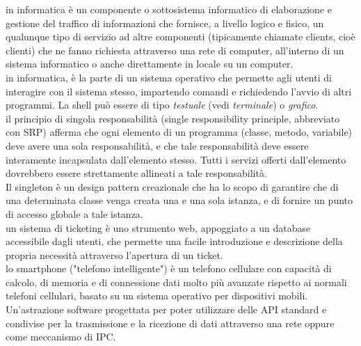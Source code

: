 \documentclass{scalatekids-article}
\begin{document}
   in informatica è un componente o sottosistema informatico di elaborazione e gestione del traffico di informazioni che fornisce, a livello logico e fisico, un qualunque tipo di servizio ad altre componenti (tipicamente chiamate clients, cioè clienti) che ne fanno richiesta attraverso una rete di computer, all'interno di un sistema informatico o anche direttamente in locale su un computer.
  \\
  
   in informatica, è la parte di un sistema operativo che permette agli utenti di interagire con il sistema stesso, impartendo comandi e richiedendo l'avvio di altri programmi.
  La shell può essere di tipo \textit{testuale} (vedi \textit{terminale}) o \textit{grafico}.
  \\

   il principio di singola responsabilità (single responsibility principle, abbreviato con SRP) afferma che ogni elemento di un programma (classe, metodo, variabile) deve avere una sola responsabilità, e che tale responsabilità deve essere interamente incapsulata dall'elemento stesso. Tutti i servizi offerti dall'elemento dovrebbero essere strettamente allineati a tale responsabilità.
  \\

   Il singleton è un design pattern creazionale che ha lo scopo di garantire che di una determinata classe venga creata una e una sola istanza, e di fornire un punto di accesso globale a tale istanza.
  \\

   un sistema di ticketing è uno strumento web, appoggiato a un database accessibile dagli utenti, che permette una facile introduzione e descrizione della propria necessità attraverso l’apertura di un ticket.
  \\

   lo smartphone ("telefono intelligente") è un telefono cellulare con capacità di calcolo, di memoria e di connessione dati molto più avanzate rispetto ai normali telefoni cellulari, basato su un sistema operativo per dispositivi mobili.
  \\

   Un'astrazione software progettata per poter utilizzare delle API standard e condivise per la trasmissione e la ricezione di dati attraverso una rete oppure come meccanismo di IPC.
  \\
\end{document}
